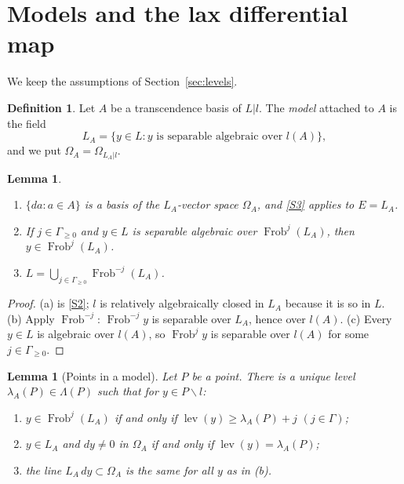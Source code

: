 \documentclass[11pt]{amsart}
\newtheorem{lemma}[theorem]{Lemma}
\theoremstyle{definition}
\newtheorem{definition}[theorem]{Definition}
\theoremstyle{remark}
\newcommand{\Frob}{\operatorname{Frob}}
\newcommand{\lev}{\operatorname{lev}}
\newcommand{\sm}{\smallsetminus}
\begin{document}
\section{Models and the lax differential map}\label{sec:models}

We keep the assumptions of Section~\ref{sec:levels}.

\begin{definition}
Let $A$ be a transcendence basis of $L|l$. The \emph{model} attached to $A$ is the field
\[ L_A=\{y\in L : y \text{ is separable algebraic over } l(A)\}, \]
and we put $\Omega_A=\Omega_{L_A|l}$.
\end{definition}

\begin{lemma}\label{lem:model}
\begin{enumerate}[label=\textup{(\alph*)}]
\item $\{da:a\in A\}$ is a basis of the $L_A$-vector space $\Omega_A$, and \ref{S3} applies to $E=L_A$.
\item If $j\in\Gamma_{\ge 0}$ and $y\in L$ is separable algebraic over $\Frob^j(L_A)$, then $y\in\Frob^j(L_A)$.
\item $L=\bigcup_{j\in\Gamma_{\ge0}}\Frob^{-j}(L_A)$.
\end{enumerate}
\end{lemma}

\begin{proof}
(a) is \ref{S2}; $l$ is relatively algebraically closed in $L_A$ because it is so in $L$.
(b) Apply $\Frob^{-j}$: $\Frob^{-j}y$ is separable over $L_A$, hence over $l(A)$.
(c) Every $y\in L$ is algebraic over $l(A)$, so $\Frob^jy$ is separable over $l(A)$ for some $j\in\Gamma_{\geq0}$.
\end{proof}

\begin{lemma}[Points in a model]\label{lem:pointsmodel}
Let $P$ be a point. There is a unique level $\lambda_A(P)\in\Lambda(P)$ such that for $y\in P\sm l$:
\begin{enumerate}[label=\textup{(\alph*)}]
\item $y\in\Frob^j(L_A)$ if and only if $\lev(y)\ge\lambda_A(P)+j$ $(j\in\Gamma)$;
\item $y\in L_A$ and $dy\neq0$ in $\Omega_A$ if and only if $\lev(y)=\lambda_A(P)$;
\item the line $L_A\,dy\subset\Omega_A$ is the same for all $y$ as in \textup{(b)}.
\end{enumerate}
\end{lemma}
\end{document}
